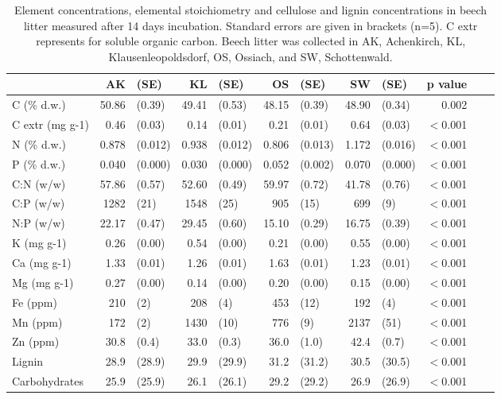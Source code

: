 \begin{landscape}
\begin{table}[h!]
\caption{Element concentrations, elemental stoichiometry and cellulose and lignin concentrations in beech litter measured after 14 days incubation. Standard errors are given in brackets (n=5). C extr represents for soluble organic carbon. Beech litter was collected in AK, Achenkirch, KL, Klausenleopoldsdorf, OS, Ossiach, and SW, Schottenwald.}
\label{initstoech}

{\small
\begin{tabular}{lrlrlrlrlrlr}
  \hline
 & AK & (SE) & KL & (SE) & OS & (SE) & SW & (SE) & p value \\ 
  \hline
C (\% d.w.) & 50.86 & (0.39) & 49.41 & (0.53) & 48.15 & (0.39) & 48.90 & (0.34) & 0.002 \\ 
  C extr (mg g-1) & 0.46 & (0.03) & 0.14 & (0.01) & 0.21 & (0.01) & 0.64 & (0.03) & $<$0.001 \\ 
  N (\% d.w.) & 0.878 &  (0.012) & 0.938 &  (0.012) & 0.806 &  (0.013) & 1.172 &  (0.016) & $<$0.001 \\ 
  P (\% d.w.) & 0.040 & (0.000) & 0.030 & (0.000) & 0.052 & (0.002) & 0.070 & (0.000) & $<$0.001 \\ 
  C:N (w/w) & 57.86 &  (0.57) & 52.60 &  (0.49) & 59.97 &  (0.72) & 41.78 &  (0.76) & $<$0.001 \\ 
  C:P (w/w) & 1282 & (21) & 1548 & (25) & 905 & (15) & 699 & (9) & $<$0.001 \\ 
  N:P (w/w) & 22.17 & (0.47) & 29.45 & (0.60) & 15.10 & (0.29) & 16.75 & (0.39) & $<$0.001 \\ 
  K (mg g-1) & 0.26 & (0.00) & 0.54 & (0.00) & 0.21 & (0.00) & 0.55 & (0.00) & $<$0.001 \\ 
  Ca (mg g-1) & 1.33 & (0.01) & 1.26 & (0.01) & 1.63 & (0.01) & 1.23 & (0.01) & $<$0.001 \\ 
  Mg (mg g-1) & 0.27 &  (0.00) & 0.14 &  (0.00) & 0.20 &  (0.00) & 0.15 &  (0.00) & $<$0.001 \\ 
  Fe (ppm) & 210 & (2) & 208 & (4) & 453 & (12) & 192 & (4) & $<$0.001 \\ 
  Mn (ppm) & 172 &  (2) & 1430 &  (10) & 776 &  (9) & 2137 &  (51) & $<$0.001 \\ 
  Zn (ppm) & 30.8 & (0.4) & 33.0 & (0.3) & 36.0 & (1.0) & 42.4 & (0.7) & $<$0.001 \\ 
  Lignin & 28.9 & (28.9) & 29.9 & (29.9) & 31.2 & (31.2) & 30.5 & (30.5) & $<$0.001 \\ 
  Carbohydrates & 25.9 & (25.9) & 26.1 & (26.1) & 29.2 & (29.2) & 26.9 & (26.9) & $<$0.001 \\ 
   \hline
\end{tabular}
}
\end{table}
\end{landscape}
